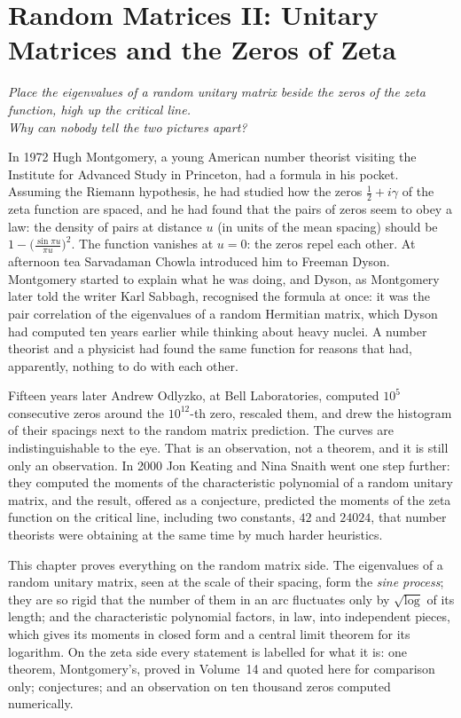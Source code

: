 \chapter{Random Matrices II: Unitary Matrices and the Zeros of Zeta}\label{ch:cue}

\begin{center}\itshape
Place the eigenvalues of a random unitary matrix beside the zeros of the zeta function, high up the critical line.\\
Why can nobody tell the two pictures apart?
\end{center}

In 1972 Hugh Montgomery, a young American number theorist visiting the Institute for Advanced Study in Princeton, had a formula in his pocket. Assuming the Riemann hypothesis, he had studied how the
zeros $\frac12+i\gamma$ of the zeta function are spaced, and he had found that the pairs of zeros seem to obey a law: the density of pairs at distance $u$ (in units of the mean spacing) should be $1-\bigl(\frac{\sin\pi u}{\pi u}\bigr)^2$.
The function vanishes at $u=0$: the zeros repel each other. At afternoon tea Sarvadaman Chowla introduced him to Freeman Dyson. Montgomery started to explain what he was doing, and Dyson, as Montgomery later told the
writer Karl Sabbagh, recognised the formula at once: it was the pair correlation of the eigenvalues of a random Hermitian matrix, which Dyson had computed ten years earlier while thinking about heavy nuclei.
A number theorist and a physicist had found the same function for reasons that had, apparently, nothing to do with each other.

Fifteen years later Andrew Odlyzko, at Bell Laboratories, computed $10^5$ consecutive zeros around the $10^{12}$-th zero, rescaled them, and drew the histogram of their spacings next to the random matrix prediction. The curves are
indistinguishable to the eye. That is an observation, not a theorem, and it is still only an observation. In 2000 Jon Keating and Nina Snaith went one step further: they computed the moments of the characteristic polynomial of a random unitary matrix, and the result, offered as a conjecture, predicted the moments of the
zeta function on the critical line, including two constants, $42$ and $24024$, that number theorists were obtaining at the same time by much harder heuristics.

This chapter proves everything on the random matrix side. The eigenvalues of a random unitary matrix, seen at the scale of their spacing, form the \emph{sine process}; they are so rigid that the number of them in an arc
fluctuates only by $\sqrt{\log}$ of its length; and the characteristic polynomial factors, in law, into independent pieces, which gives its moments in closed form and a central limit theorem for its logarithm. On the zeta side every
statement is labelled for what it is: one theorem, Montgomery's, proved in Volume~14 and quoted here for comparison only; conjectures; and an observation on ten thousand zeros computed numerically.

